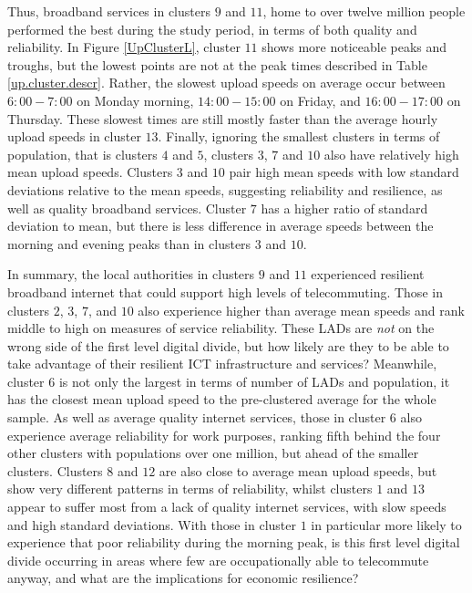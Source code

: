 \documentclass[Royal,times,sageh]{sagej}
\begin{document}
Thus, broadband services in clusters \(9\) and \(11\), home to over
twelve million people performed the best during the study period, in
terms of both quality and reliability. In Figure \ref{UpClusterL},
cluster \(11\) shows more noticeable peaks and troughs, but the lowest
points are not at the peak times described in Table
\ref{up.cluster.descr}. Rather, the slowest upload speeds on average
occur between \(6:00-7:00\) on Monday morning, \(14:00-15:00\) on
Friday, and \(16:00-17:00\) on Thursday. These slowest times are still
mostly faster than the average hourly upload speeds in cluster \(13\).
Finally, ignoring the smallest clusters in terms of population, that is
clusters \(4\) and \(5\), clusters \(3\), \(7\) and \(10\) also have
relatively high mean upload speeds. Clusters \(3\) and \(10\) pair high
mean speeds with low standard deviations relative to the mean speeds,
suggesting reliability and resilience, as well as quality broadband
services. Cluster \(7\) has a higher ratio of standard deviation to
mean, but there is less difference in average speeds between the morning
and evening peaks than in clusters \(3\) and \(10\).

In summary, the local authorities in clusters \(9\) and \(11\)
experienced resilient broadband internet that could support high levels
of telecommuting. Those in clusters \(2\), \(3\), \(7\), and \(10\) also
experience higher than average mean speeds and rank middle to high on
measures of service reliability. These LADs are \emph{not} on the wrong
side of the first level digital divide, but how likely are they to be
able to take advantage of their resilient ICT infrastructure and
services? Meanwhile, cluster \(6\) is not only the largest in terms of
number of LADs and population, it has the closest mean upload speed to
the pre-clustered average for the whole sample. As well as average
quality internet services, those in cluster \(6\) also experience
average reliability for work purposes, ranking fifth behind the four
other clusters with populations over one million, but ahead of the
smaller clusters. Clusters \(8\) and \(12\) are also close to average
mean upload speeds, but show very different patterns in terms of
reliability, whilst clusters \(1\) and \(13\) appear to suffer most from
a lack of quality internet services, with slow speeds and high standard
deviations. With those in cluster \(1\) in particular more likely to
experience that poor reliability during the morning peak, is this first
level digital divide occurring in areas where few are occupationally
able to telecommute anyway, and what are the implications for economic
resilience?
\end{document}
